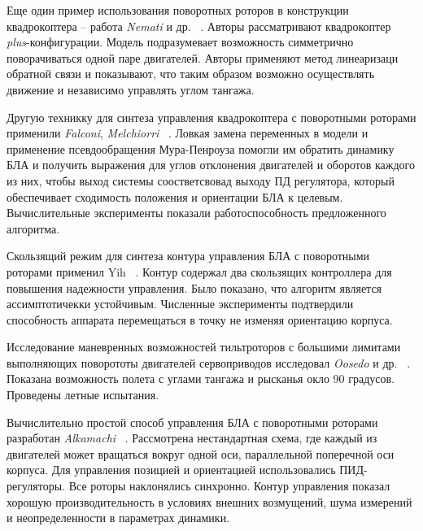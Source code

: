 Еще один пример использования поворотных роторов в конструкции квадрокоптера -- работа \textit{Nemati} и др. ~\cite{Nemati01}. Авторы рассматривают квадрокоптер \textit{plus}-конфигурации. Модель подразумевает возможность симметрично поворачиваться одной паре двигателей. Авторы применяют метод линеаризаци обратной связи и показывают, что таким образом возможно осуществлять движение и независимо управлять углом тангажа.


Другую техникку для синтеза управления квадрокоптера с поворотными роторами применили \textit{Falconi}, \textit{Melchiorri} ~\cite{Falconi01}. Ловкая замена переменных в модели и применение псевдообращения Мура-Пенроуза помогли им обратить динамику БЛА и получить выражения для углов отклонения двигателей и оборотов каждого из них, чтобы выход системы соостветсвовад выходу ПД регулятора, который обеспечивает сходимость положения и ориентации БЛА к целевым. Вычислительные эксперименты показали работоспособность предложенного алгоритма.

Скользящий режим для синтеза контура управления БЛА с поворотными роторами применил Yih ~\cite{Yih01}. Контур содержал два скользящих контроллера для повышения надежности управления. Было показано, что алгоритм является ассимптотичекки устойчивым. Численные эксперименты подтвердили способность аппарата перемещаться в точку не изменяя ориентацию корпуса.

Исследование маневренных возможностей тильтроторов с большими лимитами выполняющих поворототы двигателей сервоприводов исследовал \textit{Oosedo} и др. ~\cite{Oosedo01}. Показана возможность полета с углами тангажа и рысканья окло 90 градусов. Проведены летные испытания.

Вычислительно простой способ управления БЛА с поворотными роторами разработан \textit{Alkamachi} ~\cite{Alkamachi01}. Рассмотрена нестандартная схема, где каждый из двигателей может вращаться вокруг одной оси, параллельной поперечной оси корпуса. Для управления позицией и ориентацией использовались ПИД-регуляторы. Все роторы наклонялись синхронно. Контур управления показал хорошую производительность в условиях внешних возмущений, шума измерений и неопределенности в параметрах динамики.
